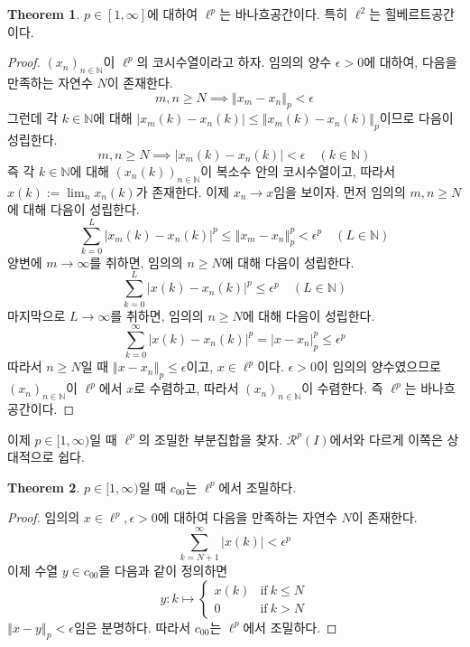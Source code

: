 \documentclass[11pt]{book}
\numberwithin{equation}{chapter}
\def\NN{\mathbb{N}}
\def\eps{\epsilon}
\def\calR{\mathcal{R}}
\newcommand{\abs}[1]{\left\vert#1\right\vert}
\newcommand{\norm}[1]{\left\Vert#1\right\Vert}
\def\textif{\text{if}}
\theoremstyle{definition}
\newtheorem{thm}{Theorem}[section]
\begin{document}
\begin{thm}
    \(p \in [1, \infty]\)에 대하여 \(\ell^p\)는 바나흐공간이다. 특히 \(\ell^2\)는 힐베르트공간이다.
\end{thm}
\begin{proof}
    \((x_n)_{n \in \NN}\)이 \(\ell^p\)의 코시수열이라고 하자. 임의의 양수 \(\eps > 0\)에 대하여, 다음을 만족하는 자연수 \(N\)이 존재한다.
    \[
    m, n \ge N \implies \norm{x_m - x_n}_p < \eps
    \]
    그런데 각 \(k \in \NN\)에 대해 \(\abs{x_m(k) - x_n(k)} \le \norm{x_m(k) - x_n(k)}_p\)이므로 다음이 성립한다.
    \[
    m, n \ge N \implies \abs{x_m(k) - x_n(k)} < \eps    \quad (k \in \NN)
    \]
    즉 각 \(k \in \NN\)에 대해 \((x_n(k))_{n \in \NN}\)이 복소수 안의 코시수열이고, 따라서 \(x(k) := \lim_n x_n(k)\)가 존재한다. 이제 \(x_n \to x\)임을 보이자. 먼저 임의의 \(m, n \ge N\)에 대해 다음이 성립한다.
    \[
    \sum_{k=0}^L \abs{x_m(k) - x_n(k)}^p \le \norm{x_m - x_n}_p^p < \eps^p \quad (L \in \NN)
    \]
    양변에 \(m \to \infty\)를 취하면, 임의의 \(n \ge N\)에 대해 다음이 성립한다.
    \[
        \sum_{k=0}^L \abs{x(k) - x_n(k)}^p \le \eps^p \quad (L \in \NN)
    \]
    마지막으로 \(L \to \infty\)를 취하면, 임의의 \(n \ge N\)에 대해 다음이 성립한다.
    \[
        \sum_{k=0}^\infty \abs{x(k) - x_n(k)}^p = \abs{x - x_n}_p^p \le \eps^p
    \]
    따라서 \(n \ge N\)일 때 \(\norm{x - x_n}_p \le \eps\)이고, \(x \in \ell^p\)이다. \(\eps > 0\)이 임의의 양수였으므로 \((x_n)_{n \in \NN}\)이 \(\ell^p\)에서 \(x\)로 수렴하고, 따라서 \((x_n)_{n \in \NN}\)이 수렴한다. 즉 \(\ell^p\)는 바나흐공간이다.
\end{proof}

이제 \(p \in [1, \infty)\)일 때 \(\ell^p\)의 조밀한 부분집합을 찾자. \(\calR^p(I)\)에서와 다르게 이쪽은 상대적으로 쉽다.

\begin{thm}
    \(p \in [1, \infty)\)일 때 \(c_{00}\)는 \(\ell^p\)에서 조밀하다.
\end{thm}
\begin{proof}
    임의의 \(x \in \ell^p, \eps > 0\)에 대하여 다음을 만족하는 자연수 \(N\)이 존재한다.
    \[
        \sum_{k=N+1}^\infty \abs{x(k)} < \eps^p
    \]
    이제 수열 \(y \in c_{00}\)을 다음과 같이 정의하면
    \[
        y : k \mapsto \begin{cases}
            x(k) &\textif \ k \le N\\
            0 &\textif \ k > N
        \end{cases}
    \]
    \(\norm{x - y}_p < \eps\)임은 분명하다. 따라서 \(c_{00}\)는 \(\ell^p\)에서 조밀하다.
\end{proof}
\end{document}
